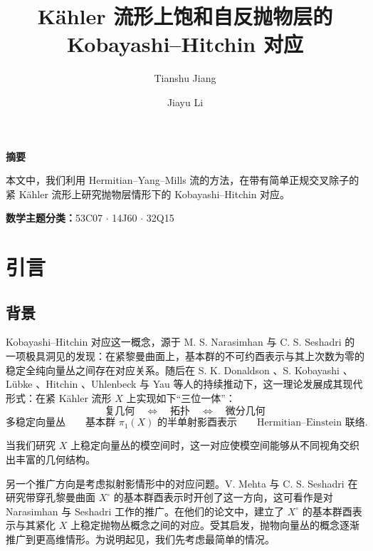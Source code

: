 \documentclass[12pt,a4paper]{article}
\title{Kähler 流形上饱和自反抛物层的\\Kobayashi--Hitchin 对应}
\author{Tianshu Jiang \and Jiayu Li}
\date{}
\begin{document}
\maketitle

\begin{center}
\textbf{摘要}
\end{center}

本文中，我们利用 Hermitian--Yang--Mills 流的方法，在带有简单正规交叉除子的紧 Kähler 流形上研究抛物层情形下的 Kobayashi--Hitchin 对应。

\vspace{1em}

\noindent
\textbf{数学主题分类：}53C07 \(\cdot\) 14J60 \(\cdot\) 32Q15

\tableofcontents

\section{引言}

\subsection{背景}

Kobayashi--Hitchin 对应这一概念，源于 M. S. Narasimhan 与 C. S. Seshadri \cite{NS} 的一项极具洞见的发现：在紧黎曼曲面上，基本群的不可约酉表示与其上次数为零的稳定全纯向量丛之间存在对应关系。随后在 S. K. Donaldson \cite{Donaldson1,Donaldson2}、S. Kobayashi \cite{Kobayashi1,Kobayashi2}、L\"ubke \cite{Luebke}、Hitchin \cite{Hitchin}、Uhlenbeck 与 Yau \cite{UY} 等人的持续推动下，这一理论发展成其现代形式：在紧 Kähler 流形 \(X\) 上实现如下“三位一体”：
\[
\text{复几何} \quad \Longleftrightarrow \quad \text{拓扑} \quad \Longleftrightarrow \quad \text{微分几何}
\]
\[
\text{多稳定向量丛}
\qquad
\text{基本群 } \pi_1(X)\text{ 的半单射影酉表示}
\qquad
\text{Hermitian--Einstein 联络}.
\]

当我们研究 \(X\) 上稳定向量丛的模空间时，这一对应使模空间能够从不同视角交织出丰富的几何结构。

另一个推广方向是考虑拟射影情形中的对应问题。V. Mehta 与 C. S. Seshadri \cite{MehtaSeshadri} 在研究带穿孔黎曼曲面 \(X^\circ\) 的基本群酉表示时开创了这一方向，这可看作是对 Narasimhan 与 Seshadri \cite{NS} 工作的推广。在他们的论文中，建立了 \(X^\circ\) 的基本群酉表示与其紧化 \(X\) 上稳定抛物丛概念之间的对应。受其启发，抛物向量丛的概念逐渐推广到更高维情形。为说明起见，我们先考虑最简单的情况。
\end{document}
